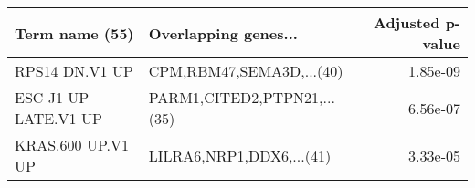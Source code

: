 \begin{tabular}{llr}
\toprule
      Term name (55) &        Overlapping genes... &  Adjusted p-value \\
\midrule
      RPS14 DN.V1 UP &    CPM,RBM47,SEMA3D,...(40) &          1.85e-09 \\
ESC J1 UP LATE.V1 UP & PARM1,CITED2,PTPN21,...(35) &          6.56e-07 \\
   KRAS.600 UP.V1 UP &    LILRA6,NRP1,DDX6,...(41) &          3.33e-05 \\
\bottomrule
\end{tabular}
